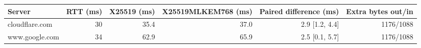 \begin{tabular}{@{}lrrrrr@{}}
\toprule
Server & RTT (ms) & X25519 (ms) & X25519MLKEM768 (ms) & Paired difference (ms) & Extra bytes out/in \\
\midrule
cloudflare.com & 30 & 35.4 & 37.0 & 2.9 [1.2, 4.4] & 1176/1088 \\
www.google.com & 34 & 62.9 & 65.9 & 2.5 [0.1, 5.7] & 1176/1088 \\
\bottomrule
\end{tabular}
